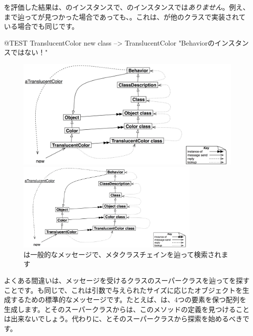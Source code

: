 \documentclass[a4paper,10pt,twoside]{book}
\begin{document}
を評価した結果は、のインスタンスで、のインスタンスでは\emph{ありません}。例え、まで辿ってが見つかった場合であっても、。これは、が他のクラスで実装されている場合でも同じです。

\begin{code}{@TEST}
TranslucentColor new class --> TranslucentColor    "Behaviorのインスタンスではない！"
\end{code}

\begin{center}
\begin{figure}
\ifluluelse
	{\centerline{\includegraphics[width=\textwidth]{TranslucentSendingNew}}}
	{\centerline{\includegraphics[width=0.8\textwidth]{TranslucentSendingNew}}}
\caption{は一般的なメッセージで、メタクラスチェインを辿って検索されます}
\end{figure}
\end{center}

よくある間違いは、メッセージを受けるクラスのスーパークラスを辿ってを探すことです。も同じで、これは引数で与えられたサイズに応じたオブジェクトを生成するための標準的なメッセージです。たとえば、は、4つの要素を保つ配列を生成します。とそのスーパークラスからは、このメソッドの定義を見つけることは出来ないでしょう。代わりに、とそのスーパークラスから探索を始めるべきです。
\end{document}
